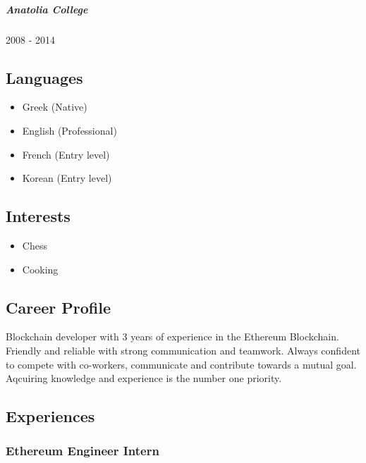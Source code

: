 \documentclass[english,]{article}
\providecommand{\tightlist}{%
  \setlength{\itemsep}{0pt}\setlength{\parskip}{0pt}}
\let\oldsubparagraph\subparagraph
\renewcommand{\subparagraph}[1]{\oldsubparagraph{#1}\mbox{}}
\begin{document}
\hypertarget{anatolia-college}{%
\subparagraph{Anatolia College}\label{anatolia-college}}

2008 - 2014

\hypertarget{languages}{%
\subsection{Languages}\label{languages}}

\begin{itemize}
\tightlist
\item
  Greek {(Native)}
\item
  English {(Professional)}
\item
  French {(Entry level)}
\item
  Korean {(Entry level)}
\end{itemize}

\hypertarget{interests}{%
\subsection{Interests}\label{interests}}

\begin{itemize}
\tightlist
\item
  Chess
\item
  Cooking
\end{itemize}

\hypertarget{career-profile}{%
\subsection{\texorpdfstring{{ \emph{} \emph{} } Career
Profile}{    Career Profile}}\label{career-profile}}

Blockchain developer with 3 years of experience in the Ethereum
Blockchain. Friendly and reliable with strong communication and
teamwork. Always confident to compete with co-workers, communicate and
contribute towards a mutual goal. Aqcuiring knowledge and experience is
the number one priority.

\hypertarget{experiences}{%
\subsection{\texorpdfstring{{ \emph{} \emph{} }
Experiences}{    Experiences}}\label{experiences}}

\hypertarget{ethereum-engineer-intern}{%
\subsubsection{Ethereum Engineer
Intern}\label{ethereum-engineer-intern}}
\end{document}
